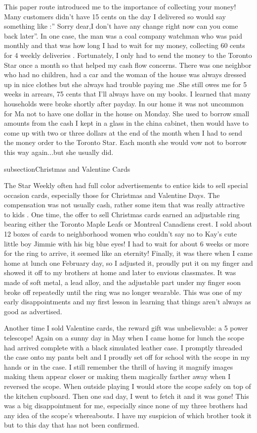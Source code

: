 This paper route introduced me to the importance of collecting your money! Many customers didn't have 15 cents on the day I delivered so would say something like :” Sorry dear,I don't have any change right now can you come back later”. In one case, the man was a coal company watchman who was paid monthly and that was how long I had to wait for my money, collecting 60 cents for 4 weekly deliveries . Fortunately, I only had to send the money to the Toronto Star once a month so that helped my cash flow concerns. There was one neighbor who had no children, had a car and the woman of the house was always dressed up in nice clothes but she always had trouble paying me .She still owes me for 5 weeks in arrears, 75 cents that I'll always have on my books. I learned that many households were broke shortly after payday. In our home it was not uncommon for Ma not to have one dollar in the house on Monday. She used to borrow small amounts from the cash I kept in a glass in the china cabinet, then would have to come up with two or three dollars at the end of the month when I had to send the money order to the Toronto Star. Each month she would vow not to borrow this way again...but she usually did.

subsection{Christmas and Valentine Cards}

The Star Weekly often had full color advertisements to entice kids to sell special occasion cards, especially those for Christmas and Valentine Days. The compensation was not usually cash, rather some item that was really attractive to kids . One time, the offer to sell Christmas cards earned an adjustable ring bearing either the Toronto Maple Leafs or Montreal Canadiens crest. I sold about 12 boxes of cards to neighborhood women who couldn't say no to Kay's cute little boy Jimmie with his big blue eyes! I had to wait for about 6 weeks or more for the ring to arrive, it seemed like an eternity! Finally, it was there when I came home at lunch one February day, so I adjusted it, proudly put it on my finger and showed it off to my brothers at home and later to envious classmates. It was made of soft metal, a lead alloy, and the adjustable part under my finger soon broke off repeatedly until the ring was no longer wearable. This was one of my early disappointments and my first lesson in learning that things aren't always as good as advertised.

Another time I sold Valentine cards, the reward gift was unbelievable: a 5 power telescope! Again on a sunny day in May when I came home for lunch the scope had arrived complete with a black simulated leather case. I promptly threaded the case onto my pants belt and I proudly set off for school with the scope in my hands or in the case. I still remember the thrill of having it magnify images making them appear closer or making them magically farther away when I reversed the scope. When outside playing I would store the scope safely on top of the kitchen cupboard. Then one sad day, I went to fetch it and it was gone! This was a big disappointment for me, especially since none of my three brothers had any idea of the scope's whereabouts. I have my suspicion of which brother took it but to this day that has not been confirmed.

